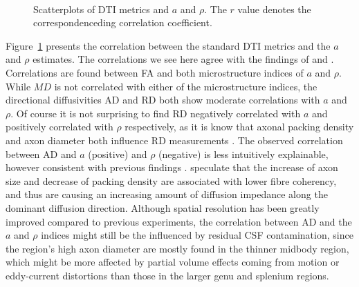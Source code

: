 \begin{figure}[ht]
{\begin{minipage}{0.5\textwidth}
					\begin{adjustbox}{width={\textwidth},totalheight=\textheight,keepaspectratio}
						\strut
						
					\end{adjustbox}\\
					\begin{adjustbox}{width={\textwidth},totalheight=\textheight,keepaspectratio}
						\strut
						
					\end{adjustbox}
					\end{minipage}
				}		
	\caption{Scatterplots of DTI metrics and $a$ and $\rho$. The $r$ value denotes the correspondenceding correlation coefficient.}
	\label{fig:chap 9 DTI correlations}	
\end{figure}	
Figure~\ref{fig:chap 9 DTI correlations} presents the correlation between the standard DTI metrics and the $a$ and $\rho$ estimates. The correlations we see here agree with the findings of \citep{Barazany:2009} and \citep{Alexander:2010}. Correlations are found between FA and both microstructure indices of $a$ and $\rho$. While $MD$ is not correlated with either of the microstructure indices, the directional diffusivities AD and RD both show moderate correlations with $a$ and $\rho$. Of course it is not surprising to find RD negatively correlated with $a$ and positively correlated with $\rho$ respectively, as it is know that axonal packing density and axon diameter both influence RD measurements \citep{Beaulieu:2002}. The observed correlation between AD and $a$ (positive) and $\rho$ (negative) is less intuitively explainable, however consistent with previous findings \citep{Barazany:2009,Alexander:2010}.  speculate that the increase of axon size and decrease of packing density are associated with lower fibre coherency, and thus are causing an increasing amount of diffusion impedance along the dominant diffusion direction. Although spatial resolution has been greatly improved compared to previous experiments, the correlation between AD and the $a$ and $\rho$ indices might still be the influenced by residual CSF contamination, since the region's high axon diameter are mostly found in the thinner midbody region, which might be more affected by partial volume effects coming from motion or eddy-current distortions than those in the larger genu and splenium regions. 
\egroup %
\FloatBarrier
